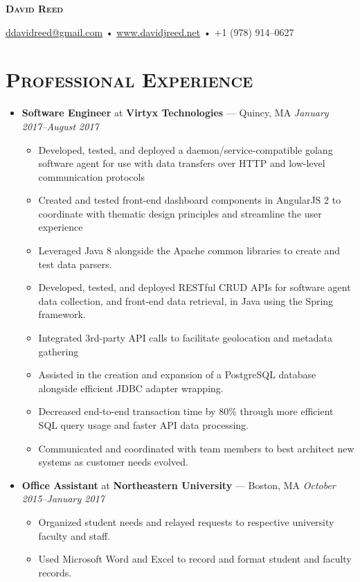 \documentclass[11pt]{article}
\begin{document}
\thispagestyle{empty}

\begin{center}
  {\LARGE\textsc{\textbf{David Reed}}}
\end{center}
\begin{center}
  \href{mailto:ddavidreed@gmail.com}{ddavidreed@gmail.com} • \href{http://www.davidjreed.net/}{www.davidjreed.net} • +1 (978) 914--0627 \\
  \hrulefill
\end{center}



\section*{\textsc{Professional Experience}}
\begin{itemize}
\item \textbf{Software Engineer} at \textbf{Virtyx Technologies} --- Quincy, MA \hfill {\em January 2017--August 2017}
  \begin{itemize}
  \item Developed, tested, and deployed a daemon/service-compatible golang software agent for use with data transfers over HTTP and low-level communication protocols
  \item Created and tested front-end dashboard components in AngularJS 2 to coordinate with thematic design principles and streamline the user experience
  \item Leveraged Java 8 alongside the Apache common libraries to create and test data parsers.
  \item Developed, tested, and deployed RESTful CRUD APIs for software agent data collection, and front-end data retrieval, in Java using the Spring framework.
  \item Integrated 3rd-party API calls to facilitate geolocation and metadata gathering
  \item Assisted in the creation and expansion of a PostgreSQL database alongside efficient JDBC adapter wrapping.
  \item Decreased end-to-end transaction time by 80\% through more efficient SQL query usage and faster API data processing.
  \item Communicated and coordinated with team members to best architect new systems as customer needs evolved.
  \end{itemize}

\item \textbf{Office Assistant} at \textbf{Northeastern University} --- Boston, MA \hfill {\em October 2015--January 2017}
  \begin{itemize}
  \item Organized student needs and relayed requests to respective university faculty and staff.
  \item Used Microsoft Word and Excel to record and format student and faculty records.
  \end{itemize}


\end{itemize}
\end{document}
